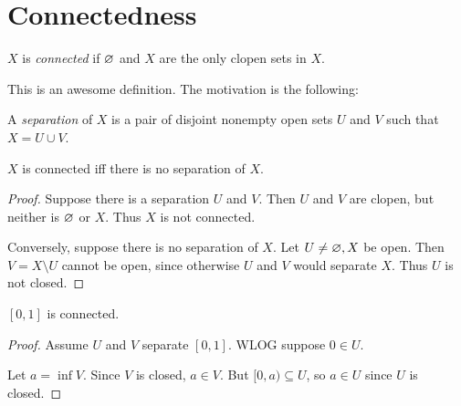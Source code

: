 \section{Connectedness} \label{sec:connect}
\begin{definition}[Connectedness] \label{def:connect}
    $X$ is \emph{connected} if $\varnothing$ and $X$ are the only clopen sets in $X$.
\end{definition}
This is an awesome definition.
The motivation is the following:
\begin{definition}[Separation] \label{def:connect:separation}
    A \emph{separation} of $X$ is a pair of disjoint nonempty open sets
    $U$ and $V$ such that $X = U \cup V$.
\end{definition}

\begin{proposition}
    $X$ is connected iff there is no separation of $X$.
\end{proposition}
\begin{proof}
    Suppose there is a separation $U$ and $V$.
    Then $U$ and $V$ are clopen, but neither is $\varnothing$ or $X$.
    Thus $X$ is not connected.

    Conversely, suppose there is no separation of $X$.
    Let $U \ne \varnothing, X$ be open.
    Then $V = X \setminus U$ cannot be open, since otherwise
    $U$ and $V$ would separate $X$.
    Thus $U$ is not closed.
\end{proof}

\begin{proposition}
    $[0, 1]$ is connected.
\end{proposition}
\begin{proof}
    Assume $U$ and $V$ separate $[0, 1]$.
    WLOG suppose $0 \in U$.

    Let $a = \inf V$.
    Since $V$ is closed, $a \in V$.
    But $[0, a) \subseteq U$, so $a \in U$ since $U$ is closed.
\end{proof}
